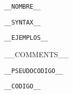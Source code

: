 \begin{aibox}{\function}
\begin{alltt}
__NOMBRE__

__SYNTAX__
\end{alltt}
\end{aibox}

\begin{aibox}{\examples}
\begin{alltt}
__EJEMPLOS__
\end{alltt}
\end{aibox}

\begin{aibox}{\comments}
__COMMENTS__
\end{aibox}

\begin{aibox}{\pseudocode}
\begin{alltt}
__PSEUDOCODIGO__
\end{alltt}
\end{aibox}

\begin{aibox}{\code}
\begin{alltt}
__CODIGO__
\end{alltt}
\end{aibox}
